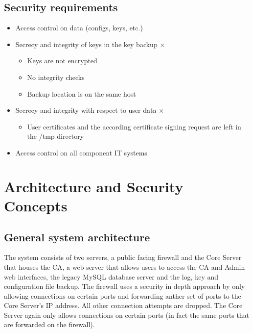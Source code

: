 \documentclass{article}
\begin{document}
\subsection{Security requirements}
\begin{itemize}
\item Access control on data (configs, keys, etc.) \checkmark
\item Secrecy and integrity of keys in the key backup $\times$
	\begin{itemize}
	\item Keys are not encrypted
	\item No integrity checks
	\item Backup location is on the same host
	\end{itemize}
\item Secrecy and integrity with respect to user data $\times$
	\begin{itemize}
	\item User certificates and the according certificate signing request are left in the /tmp directory
	\end{itemize}
\item Access control on all component IT systems \checkmark
\end{itemize}

\section{Architecture and Security Concepts}
\subsection{General system architecture}
The system consists of two servers, a public facing firewall and the Core Server that houses the CA, a web server that allows users to access the CA and Admin web interfaces, the legacy MySQL database server and the log, key and configuration file backup.\newline
The firewall uses a security in depth approach by only allowing connections on certain ports and forwarding anther set of ports to the Core Server's IP address. All other connection attempts are dropped.\newline
The Core Server again only allows connections on certain ports (in fact the same ports that are forwarded on the firewall).
\end{document}
